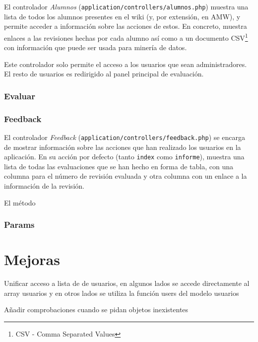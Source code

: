 \documentclass[11pt]{article}
\begin{document}
El controlador \textit{Alumnos} (\texttt{application/controllers/alumnos.php})
muestra una lista de todos los alumnos presentes en el wiki (y, por extensión,
en AMW), y permite acceder a información sobre las acciones de estos. En
concreto, muestra enlaces a las revisiones hechas por cada alumno así como a un
documento CSV\footnote{CSV - Comma Separated Values} con información que puede
ser usada para minería de datos.

Este controlador solo permite el acceso a los usuarios que sean
administradores. El resto de usuarios es redirigido al panel principal de
evaluación.

\subsubsection{Evaluar}

\subsubsection{Feedback}

El controlador \textit{Feedback} (\texttt{application/controllers/feedback.php})
se encarga de mostrar información sobre las acciones que han realizado los
usuarios en la aplicación. En su acción por defecto (tanto \texttt{index} como
\texttt{informe}), muestra una lista de todas las evaluaciones que se han hecho
en forma de tabla, con una columna para el número de revisión evaluada y otra
columna con un enlace a la información de la revisión.

El método 

\subsubsection{Params}

\section{Mejoras}

Unificar acceso a lista de de usuarios, en algunos lados se accede directamente
al array usuarios y en otros lados se utiliza la función users del modelo usuarios

Añadir comprobaciones cuando se pidan objetos inexistentes
\end{document}
